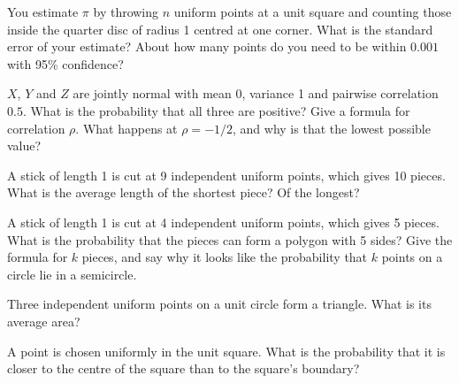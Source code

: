 \begin{question}\label{iq:iv1:continuous-and-geometric-probability:17}
You estimate $\pi$ by throwing $n$ uniform points at a unit square and counting those inside the quarter disc of radius 1 centred at one corner. What is the standard error of your estimate? About how many points do you need to be within $0.001$ with 95\% confidence?
\end{question}

\begin{question}\label{iq:iv1:continuous-and-geometric-probability:18}
$X$, $Y$ and $Z$ are jointly normal with mean 0, variance 1 and pairwise correlation $0.5$. What is the probability that all three are positive? Give a formula for correlation $\rho$. What happens at $\rho = -1/2$, and why is that the lowest possible value?
\end{question}

\begin{question}\label{iq:iv1:continuous-and-geometric-probability:19}
A stick of length 1 is cut at 9 independent uniform points, which gives 10 pieces. What is the average length of the shortest piece? Of the longest?
\end{question}

\begin{question}\label{iq:iv1:continuous-and-geometric-probability:20}
A stick of length 1 is cut at 4 independent uniform points, which gives 5 pieces. What is the probability that the pieces can form a polygon with 5 sides? Give the formula for $k$ pieces, and say why it looks like the probability that $k$ points on a circle lie in a semicircle.
\end{question}

\begin{question}\label{iq:iv1:continuous-and-geometric-probability:21}
Three independent uniform points on a unit circle form a triangle. What is its average area?
\end{question}

\begin{question}\label{iq:iv1:continuous-and-geometric-probability:22}
A point is chosen uniformly in the unit square. What is the probability that it is closer to the centre of the square than to the square's boundary?
\end{question}

